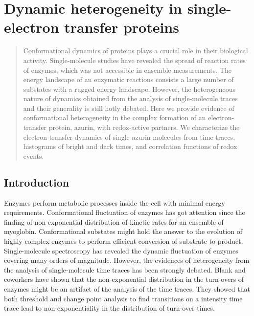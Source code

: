\chapter{Dynamic heterogeneity in single-electron transfer proteins}
\label{chapter:azurin}
\graphicspath{{./chapters/c4_azurin_sm/main/}}
\begin{abstract}
	Conformational dynamics of proteins plays a crucial role in their biological activity. Single-molecule studies have revealed the spread of reaction rates of enzymes, which was not accessible in ensemble measurements.
	The energy landscape of an enzymatic reactions consists a large number of substates with a rugged energy landscape.
	However, the heterogeneous nature of dynamics obtained from the analysis of single-molecule traces and their generality is still hotly debated.
	Here we provide evidence of conformational heterogeneity in the complex formation of an electron-transfer protein, azurin, with redox-active partners.
	We characterize the electron-transfer dynamics of single azurin molecules from time traces, histograms of bright and dark times, and correlation functions of redox events. 
\end{abstract}
\newpage
\section{Introduction}
Enzymes perform metabolic processes inside the cell with minimal energy requirements.
Conformational fluctuation of enzymes has got attention since the finding of non-exponential distribution of kinetic rates for an ensemble of myoglobin. \cite{frauenfelder1991the,ansari1985protein,stein1985a,henzler-wildman2007dynamic}
Conformational substates might hold the answer to the evolution of highly complex enzymes to perform efficient conversion of substrate to product.
Single-molecule spectroscopy has revealed the dynamic fluctuation of enzymes covering many orders of magnitude.\cite{lu1998single-molecule,yang2003protein,english2006ever-fluctuating}
However, the evidences of heterogeneity from the analysis of single-molecule time traces has been strongly debated.
Blank and coworkers have shown that the non-exponential distribution in the turn-overs of enzymes might be an artifact of the analysis of the time traces.\cite{terentyeva2012dynamic}
They showed that both threshold and change point analysis to find transitions on a intensity time trace lead to non-exponentiality in the distribution of turn-over times.


